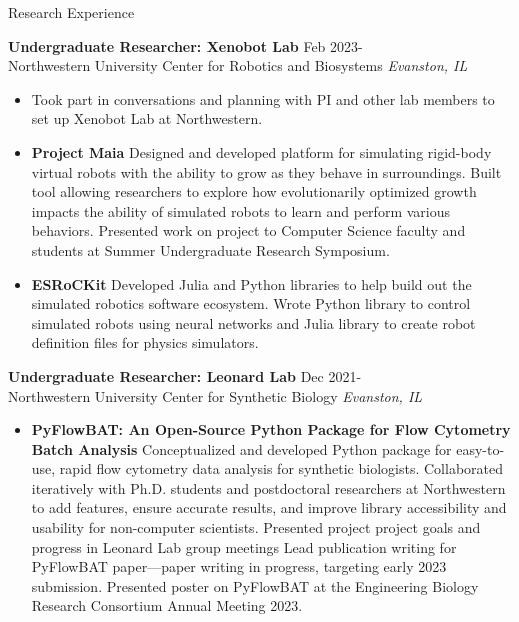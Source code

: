 \documentclass{resume} %
\begin{document}
\begin{rSection}{Research Experience}
    
    \textbf{Undergraduate Researcher: Xenobot Lab} \hfill Feb 2023- \\
     Northwestern University Center for Robotics and Biosystems \hfill \textit{Evanston, IL}
     \begin{itemize}
        \itemsep -3pt {} 
            \item[] Took part in conversations and planning with PI and other lab members to set up Xenobot Lab at Northwestern.
            \item[] \textbf{Project Maia}
            Designed and developed platform for simulating rigid-body virtual robots with the ability to grow as they behave in surroundings.
            Built tool allowing researchers to explore how evolutionarily optimized growth impacts the ability of simulated robots to learn and perform various behaviors.
            Presented work on project to Computer Science faculty and students at Summer Undergraduate Research Symposium.
            \item[] \textbf{ESRoCKit}
            Developed Julia and Python libraries to help build out the simulated robotics software ecosystem.
            Wrote Python library to control simulated robots using neural networks and Julia library to create robot definition files for physics simulators.
     \end{itemize}
     
     \textbf{Undergraduate Researcher: Leonard Lab} \hfill Dec 2021-\\
     Northwestern University Center for Synthetic Biology \hfill \textit{Evanston, IL}
     \begin{itemize}
        \itemsep -3pt {}
            \item[] \textbf{PyFlowBAT: An Open-Source Python Package for Flow Cytometry Batch Analysis}
            Conceptualized and developed Python package for easy-to-use, rapid flow cytometry data analysis for synthetic biologists.
            Collaborated iteratively with Ph.D. students and postdoctoral researchers at Northwestern to add features, ensure accurate results, and improve library accessibility and usability for non-computer scientists.
            Presented project project goals and progress in Leonard Lab group meetings
            Lead publication writing for PyFlowBAT paper—paper writing in progress, targeting early 2023 submission.
            Presented poster on PyFlowBAT at the Engineering Biology Research Consortium Annual Meeting 2023.
     \end{itemize}


\end{rSection}
\end{document}
